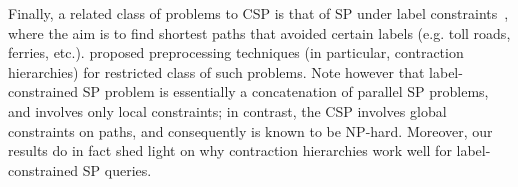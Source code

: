 Finally, a related class of problems to CSP is that of SP under label constraints~\cite{language_csp}, where the aim is to find shortest paths that avoided certain labels (e.g. toll roads, ferries, etc.). \cite{rice_csp} proposed preprocessing techniques (in particular, contraction hierarchies) for restricted class of such problems. 
Note however that label-constrained SP problem is essentially a concatenation of parallel SP problems, and involves only local constraints; in contrast, the CSP involves global constraints on paths, and consequently is known to be NP-hard. 
Moreover, our results do in fact shed light on why contraction hierarchies work well for label-constrained SP queries.